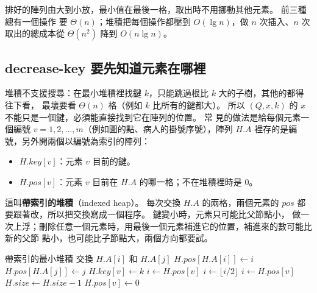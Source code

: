 排好的陣列由大到小放，最小值在最後一格，取出時不用挪動其他元素。 前三種總有一個操作
要 $\Theta(n)$；堆積把每個操作都壓到 $O(\lg n)$，做 $n$ 次插入、$n$ 次取出的總成本從
$\Theta(n^2)$ 降到 $O(n \lg n)$。

\subsection{decrease-key 要先知道元素在哪裡}

堆積不支援搜尋：在最小堆積裡找鍵 $k$，只能跳過根比 $k$ 大的子樹，其他的都得往下看，
最壞要看 $\Theta(n)$ 格（例如 $k$ 比所有的鍵都大）。 所以
$(Q, x, k)$ 的 $x$ 不能只是一個鍵，必須能直接找到它在陣列的位置。 常
見的做法是給每個元素一個編號 $v = 1, 2, \ldots, m$（例如圖的點、病人的掛號序號），陣列
$H.A$ 裡存的是編號，另外開兩個以編號為索引的陣列：

\begin{itemize}
\item $H.\mathit{key}[v]$：元素 $v$ 目前的鍵。
\item $H.\mathit{pos}[v]$：元素 $v$ 目前在 $H.A$ 的哪一格；不在堆積裡時是 $0$。
\end{itemize}

這叫\textbf{帶索引的堆積}（indexed heap）。 每次交換 $H.A$ 的兩格，兩個元素的
$\mathit{pos}$ 都要跟著改，所以把交換寫成一個程序。 鍵變小時，元素只可能比父節點小，
做一次上浮；刪除任意一個元素時，用最後一個元素補進它的位置，補進來的數可能比新的父節
點小，也可能比子節點大，兩個方向都要試。

\begin{pseudo}[label=alg:hp-indexed]{帶索引的最小堆積}
    \State 交換 $H.A[i]$ 和 $H.A[j]$
    \State $H.\mathit{pos}[H.A[i]] \gets i$
    \State $H.\mathit{pos}[H.A[j]] \gets j$
\EndProcedure
\Statex
{}
        \State {}
    \EndIf
    \State $H.\mathit{key}[v] \gets k$
    \State $i \gets H.\mathit{pos}[v]$
        \State {}
        \State $i \gets \lfloor i/2 \rfloor$
    \EndWhile
\EndProcedure
\Statex
{}
    \State $i \gets H.\mathit{pos}[v]$
    \State {}
    \State $H.\mathit{size} \gets H.\mathit{size} - 1$
    \State $H.\mathit{pos}[v] \gets 0$
        \State {}
        \State {}
    \EndIf
\EndProcedure
\end{pseudo}

